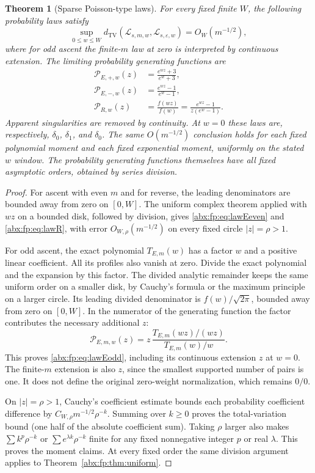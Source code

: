 \documentclass[11pt,letterpaper]{article}
\numberwithin{equation}{section}
\newtheorem{theorem}{Theorem}[section]
\theoremstyle{remark}\newtheorem{remark}[theorem]{Remark}
\newcommand{\eps}{\varepsilon}
\newcommand{\TV}{d_{\mathrm{TV}}}
\newcommand{\sq}{\sqrt{2\pi}}
\begin{document}
\begin{theorem}[Sparse Poisson-type laws]\label{abx:fp:thm:laws}
For every fixed finite $W$, the following probability laws satisfy
\begin{equation}\label{abx:fp:eq:tv}
 \sup_{0\le w\le W}\TV(\mathcal L_{s,m,w},\mathcal L_{s,\eps,w})
       =O_W(m^{-1/2}),
\end{equation}
where for odd ascent the finite-$m$ law at zero is interpreted by
continuous extension. The limiting probability generating functions are
\begin{align}
 \mathcal P_{E,+,w}(z)&=\frac{e^{wz}+3}{e^w+3},\label{abx:fp:eq:lawEeven}\\
 \mathcal P_{E,-,w}(z)&=\frac{e^{wz}-1}{e^w-1},\label{abx:fp:eq:lawEodd}\\
 \mathcal P_{R,w}(z)&=\frac{f(wz)}{f(w)}
                     =\frac{e^{wz}-1}{z(e^w-1)}.\label{abx:fp:eq:lawR}
\end{align}
Apparent singularities are removed by continuity. At $w=0$ these laws
are, respectively, $\delta_0$, $\delta_1$, and $\delta_0$.
The same $O(m^{-1/2})$ conclusion holds for each fixed polynomial
moment and each fixed exponential moment, uniformly on the stated
$w$ window. The probability generating functions themselves have
all fixed asymptotic orders, obtained by series division.
\end{theorem}
\begin{proof}
For ascent with even $m$ and for reverse, the leading denominators
are bounded away from zero on $[0,W]$. The uniform complex theorem
applied with $wz$ on a bounded disk, followed by division, gives
\eqref{abx:fp:eq:lawEeven} and \eqref{abx:fp:eq:lawR}, with error $O_{W,\rho}(m^{-1/2})$
on every fixed circle $|z|=\rho>1$.

For odd ascent, the exact polynomial $T_{E,m}(w)$ has a factor $w$
and a positive linear coefficient. All its profiles also vanish at
zero. Divide the exact polynomial and the expansion by this factor.
The divided analytic remainder keeps the same uniform order on a
smaller disk, by Cauchy's formula or the maximum principle on a larger
circle. Its leading divided denominator is $f(w)/\sq$, bounded away
from zero on $[0,W]$. In the numerator of the generating function the
factor contributes the necessary additional $z$:
\[
 \mathcal P_{E,m,w}(z)=z\,
 \frac{T_{E,m}(wz)/(wz)}{T_{E,m}(w)/w}.
\]
This proves \eqref{abx:fp:eq:lawEodd}, including its continuous extension
$z$ at $w=0$. The finite-$m$ extension is also $z$, since the smallest
supported number of pairs is one. It does not define the original
zero-weight normalization, which remains $0/0$.

On $|z|=\rho>1$, Cauchy's coefficient estimate bounds each probability
coefficient difference by $C_{W,\rho}m^{-1/2}\rho^{-k}$. Summing over
$k\ge0$ proves the total-variation bound (one half of the absolute
coefficient sum). Taking $\rho$ larger also makes
$\sum k^p\rho^{-k}$ or $\sum e^{\lambda k}\rho^{-k}$ finite for any
fixed nonnegative integer $p$ or real $\lambda$. This proves the moment
claims. At every fixed order the same division argument applies to
Theorem~\ref{abx:fp:thm:uniform}.
\end{proof}
\end{document}
